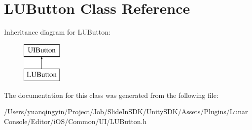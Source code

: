 \hypertarget{interface_l_u_button}{}\section{L\+U\+Button Class Reference}
\label{interface_l_u_button}
Inheritance diagram for L\+U\+Button\+:\begin{figure}[H]
\begin{center}
\leavevmode
\includegraphics[height=2.000000cm]{interface_l_u_button}
\end{center}
\end{figure}


The documentation for this class was generated from the following file\+:\begin{DoxyCompactItemize}
\item 
/\+Users/yuanqingyin/\+Project/\+Job/\+Slide\+In\+S\+D\+K/\+Unity\+S\+D\+K/\+Assets/\+Plugins/\+Lunar\+Console/\+Editor/i\+O\+S/\+Common/\+U\+I/L\+U\+Button.\+h\end{DoxyCompactItemize}
